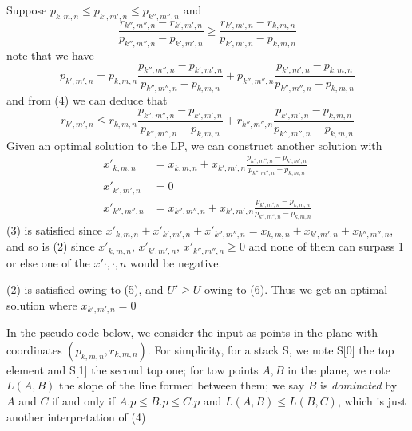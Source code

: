 \documentclass[10pt, oneside]{report}
\begin{document}
Suppose $p_{k,m,n}\le p_{k',m',n}\le p_{k'',m'',n}$ and
\begin{equation}
\frac{r_{k'',m'',n}-r_{k',m',n}}{p_{k'',m'',n}-p_{k',m',n}}\ge\frac{r_{k',m',n}-r_{k,m,n}}{p_{k',m',n}-p_{k,m,n}}
\end{equation}
note that we have
\begin{equation}
p_{k',m',n}=p_{k,m,n}\frac{p_{k'',m'',n}-p_{k',m',n}}{p_{k'',m'',n}-p_{k,m,n}}+p_{k'',m'',n}\frac{p_{k',m',n}-p_{k,m,n}}{p_{k'',m'',n}-p_{k,m,n}}
\end{equation}
and from (4) we can deduce that
\begin{equation}
r_{k',m',n}\le r_{k,m,n}\frac{p_{k'',m'',n}-p_{k',m',n}}{p_{k'',m'',n}-p_{k,m,n}}+r_{k'',m'',n}\frac{p_{k',m',n}-p_{k,m,n}}{p_{k'',m'',n}-p_{k,m,n}}
\end{equation}
Given an optimal solution to the LP, we can construct another solution with
\begin{align*}
x'_{k,m,n}&=x_{k,m,n}+x_{k',m',n}\frac{p_{k'',m'',n}-p_{k',m',n}}{p_{k'',m'',n}-p_{k,m,n}}\\
x'_{k',m',n}&=0\\
x'_{k'',m'',n}&=x_{k'',m'',n}+x_{k',m',n}\frac{p_{k',m',n}-p_{k,m,n}}{p_{k'',m'',n}-p_{k,m,n}}
\end{align*}
(3) is satisfied since $x'_{k,m,n}+x'_{k',m',n}+x'_{k'',m'',n}=x_{k,m,n}+x_{k',m',n}+x_{k'',m'',n}$, and so is (2) since $x'_{k,m,n},\,x'_{k',m',n},\,x'_{k'',m'',n}\ge0$ and none of them can surpass 1 or else one of the $x'{\cdot,\cdot,n}$ would be negative.

(2) is satisfied owing to (5), and $U'\ge U$ owing to (6). Thus we get an optimal solution where $x_{k',m',n}=0$

In the pseudo-code below, we consider the input as points in the plane with coordinates $(p_{k,m,n},r_{k,m,n})$. For simplicity, for a stack S, we note S[0] the top element and S[1] the second top one; for tow points $A,B$ in the plane, we note $L(A,B)$ the slope of the line formed between them; we say $B$ is \emph{dominated} by $A$ and $C$ if and only if $A.p\le B.p\le C.p$ and $L(A,B)\le L(B,C)$, which is just another interpretation of (4)

\hspace{1em}
\end{document}
